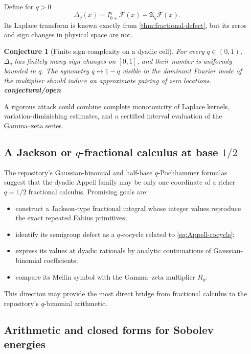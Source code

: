\documentclass[11pt]{article}
\newcommand{\statusopen}{\textcolor{statusred}{\textbf{conjectural/open}}}
\newtheorem{conjecture}[theorem]{Conjecture}
\theoremstyle{definition}
\theoremstyle{remark}
\newcommand{\extF}{\mathcal F}
\newcommand{\Aop}{\mathfrak A}
\begin{document}
Define for $q>0$
\begin{equation}
 \Delta_q(x)=I_{0+}^{q}\extF(x)-\Aop_q\extF(x).
 \label{eq:physical-defect}
\end{equation}
Its Laplace transform is known exactly from \cref{thm:fractional-defect}, but its zeros and
sign changes in physical space are not.

\begin{conjecture}[Finite sign complexity on a dyadic cell]
For every $q\in(0,1)$, $\Delta_q$ has finitely many sign changes on $[0,1]$, and their number
is uniformly bounded in $q$.  The symmetry $q\leftrightarrow1-q$ visible in the dominant
Fourier mode of the multiplier should induce an approximate pairing of zero locations.
\statusopen
\end{conjecture}

A rigorous attack could combine complete monotonicity of Laplace kernels, variation-diminishing
estimates, and a certified interval evaluation of the Gamma--zeta series.

\subsection{A Jackson or $q$-fractional calculus at base $1/2$}

The repository's Gaussian-binomial and half-base $q$-Pochhammer formulas suggest that the
dyadic Appell family may be only one coordinate of a richer $q=1/2$ fractional calculus.
Promising goals are:
\begin{itemize}
\item construct a Jackson-type fractional integral whose integer values reproduce the exact
      repeated Fabius primitives;
\item identify its semigroup defect as a $q$-cocycle related to \cref{eq:Appell-cocycle};
\item express its values at dyadic rationals by analytic continuations of Gaussian-binomial
      coefficients;
\item compare its Mellin symbol with the Gamma--zeta multiplier $R_q$.
\end{itemize}
This direction may provide the most direct bridge from fractional calculus to the repository's
$q$-binomial arithmetic.

\subsection{Arithmetic and closed forms for Sobolev energies}
\end{document}
